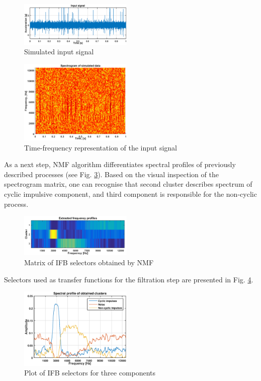 \documentclass[conference]{IEEEtran}
\begin{document}
\begin{figure}[!ht]
\centering
\includegraphics[width = 0.48\textwidth]{figs/input_sig.eps}
\caption{Simulated input signal}
\label{fig: input}
\end{figure}

\begin{figure}[!ht]
\centering
\includegraphics[width = 0.48\textwidth]{figs/input_spec.eps}
\caption{Time-frequency representation of the input signal}
\label{fig: spectrogram}
\end{figure}

As a next step, NMF algorithm differentiates spectral profiles of previously described processes (see Fig. \ref{fig: selmat}). Based on the visual inspection of the spectrogram matrix, one can recognise that second cluster describes spectrum of cyclic impulsive component, and third component is responsible for the non-cyclic process.

\begin{figure}[!ht]
\centering
\includegraphics[width = 0.48\textwidth]{figs/selector_matrix.png}
\caption{Matrix of IFB selectors obtained by NMF}
\label{fig: selmat}
\end{figure}

Selectors used as transfer functions for the filtration step are presented in Fig. \ref{fig: selplots}. 

\begin{figure}[!ht]
\centering
\includegraphics[width = 0.48\textwidth]{figs/selector_plot.eps}
\caption{Plot of IFB selectors for three components}
\label{fig: selplots}
\end{figure}
\end{document}
